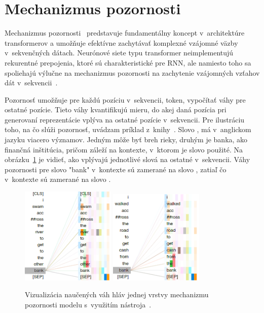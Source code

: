 \section{Mechanizmus pozornosti}

Mechanizmus pozornosti~\cite{vaswani2023attention} predstavuje fundamentálny koncept v~architektúre transformerov a umožňuje efektívne zachytávať komplexné vzájomné väzby v~sekvenčných dátach. Neurónové siete typu transformer neimplementujú rekurentné prepojenia, ktoré sú charakteristické pre RNN, ale namiesto toho sa spoliehajú výlučne na mechanizmus pozornosti na zachytenie vzájomných vzťahov dát v~sekvencii~\cite{BishopDeepLearning}.


Pozornosť umožňuje pre každú pozíciu v~sekvencii, token, vypočítať váhy pre ostatné pozície. Tieto váhy kvantifikujú mieru, do akej daná pozícia pri generovaní reprezentácie vplýva na ostatné pozície v~sekvencii. Pre ilustráciu toho, na čo slúži pozornosť, uvádzam príklad z~knihy~\cite{BishopDeepLearning}. Slovo , má v~anglickom jazyku viacero významov. Jedným môže byť breh rieky, druhým je banka, ako finančná inštitúcia, pričom záleží na kontexte, v~ktorom je slovo použité. Na obrázku~\ref{fig:attention_view} je vidieť, ako vplývajú jednotlivé slová na ostatné v~sekvencii. Váhy pozornosti pre slovo "bank" v~kontexte \textit{} sú zamerané na slovo \textit{}, zatiaľ čo v~kontexte \textit{} sú zamerané na slovo \textit{}.

\begin{figure}[!ht]
    \centering
    \includegraphics[width=0.4\textwidth]{obrazky/attention_view1.png}
    \includegraphics[width=0.4\textwidth]{obrazky/attention_view2.png}
    \caption{Vizualizácia naučených váh hláv jednej vrstvy mechanizmu pozornosti modelu \BERT{} s~využitím nástroja~\cite{vig-2019-multiscale}.}
    \label{fig:attention_view}
\end{figure}

